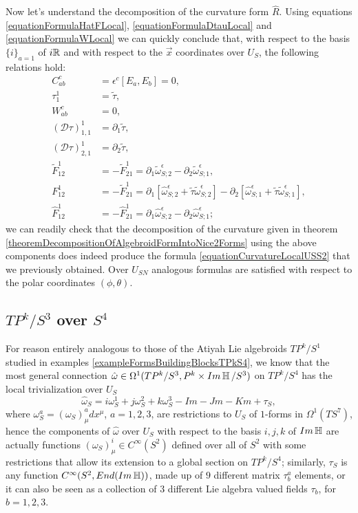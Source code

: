 Now let's understand the decomposition of the curvature form $\hat R$. Using equations \eqref{equationFormulaHatFLocal}, \eqref{equationFormulaDtauLocal} and \eqref{equationFormulaWLocal} we can quickly conclude that, with respect to the basis $\{i\}_{a = 1}$ of $i\mathbb{R}$ and with respect to the $\vec x$ coordinates over $U_S$, the following relations hold:
\begin{align*}
    C^c_{ab} &= \epsilon^c[E_a, E_b] = 0,\\
    \tau^1_1 &= \tilde \tau,\\
    W_{ab}^c &= 0,\\
    (\mathcal D \tau)^1_{1,1} &= \partial_1 \tilde \tau,\\
    (\mathcal D \tau)^1_{2,1} &= \partial_2 \tilde \tau,\\
    \tilde F^1_{12} &= - \tilde F^1_{21} = \partial_{1} \tilde \omega^\epsilon_{S;2} - \partial_{2} \tilde \omega^\epsilon_{S;1},\\
    F^1_{12} &= - \tilde F^1_{21} = \partial_{1} [\hat \omega^\epsilon_{S;2} + \tilde \tau \tilde \omega^\epsilon_{S;2}] - \partial_{2} [\hat \omega^\epsilon_{S;1} + \tilde \tau \tilde \omega^\epsilon_{S;1}],\\
    \hat F^1_{12} &= - \hat F^1_{21} = \partial_{1} \hat \omega^\epsilon_{S;2} - \partial_{2} \hat \omega^\epsilon_{S;1};
\end{align*}
we can readily check that the decomposition of the curvature given in theorem \ref{theoremDecompositionOfAlgebroidFormIntoNice2Forms} using the above components does indeed produce the formula \eqref{equationCurvatureLocalUSS2} that we previously obtained. Over $U_{SN}$ analogous formulas are satisfied with respect to the polar coordinates $(\phi, \theta)$.


\subsection{$TP^k/S^3$ over $S^4$}\label{subsectionConnectionsTPkS3}

For reason entirely analogous to those of the Atiyah Lie algebroids $TP^k/S^1$ studied in examples \ref{exampleFormsBuildingBlocksTPkS4}, we know that the most general connection $\hat \omega \in \Omega^1
(TP^k/S^3, P^k \times Im \operatorname{\mathbb{H}}/S^3)$ on $TP^k/S^4$ has the local trivialization over $U_S$
\begin{equation}
    \hat \omega_S = i \omega_S^1 + j \omega_S^2 + k \omega_S^3 - Im - Jm - Km + \tau_S,
\end{equation}
where $\omega_S^a = (\omega_S)^a_\mu dx^\mu$, $a = 1, 2, 3$, are restrictions to $U_S$ of $1$-forms in $\Omega^1(TS^7)$, hence the components of $\hat \omega$ over $U_S$ with respect to the basis $i, j, k$ of $Im \operatorname{\mathbb{H}}$ are actually functions $(\omega_S)^i_\mu \in C^\infty(S^2)$ defined over all of $S^2$ with some restrictions that allow its extension to a global section on $TP^k/S^4$; similarly, $\tau_S$ is any function $C^\infty(S^2, End(Im \operatorname{\mathbb{H}}))$, made up of $9$ different matrix $\tau^a_b$ elements, or it can also be seen as a collection of $3$ different Lie algebra valued fields $\tau_b$, for $b = 1, 2, 3$.


